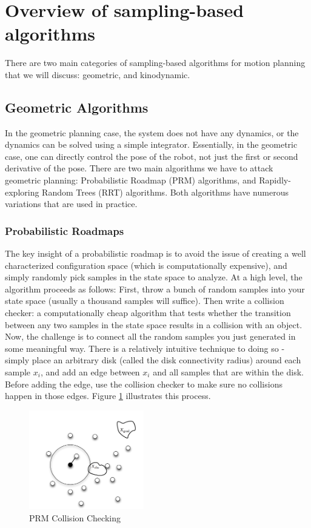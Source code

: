 \documentclass[twoside]{article}
\begin{document}
\section{Overview of sampling-based algorithms} %
There are two main categories of sampling-based algorithms for motion planning that we will discuss: geometric, and kinodynamic.

\subsection{Geometric Algorithms}
In the geometric planning case, the system does not have any dynamics, or the dynamics can be solved using a simple integrator. Essentially, in the geometric case, one can directly control the pose of the robot, not just the first or second derivative of the pose. There are two main algorithms we have to attack geometric planning: Probabilistic Roadmap (PRM) algorithms, and Rapidly-exploring Random Trees (RRT) algorithms. Both algorithms have numerous variations that are used in practice.

\subsubsection{Probabilistic Roadmaps}
The key insight of a probabilistic roadmap is to avoid the issue of creating a well characterized configuration space (which is computationally expensive), and simply randomly pick samples in the state space to analyze. At a high level, the algorithm proceeds as follows: First, throw a bunch of random samples into your state space (usually a thousand samples will suffice). Then write a collision checker: a computationally cheap algorithm that tests whether the transition between any two samples in the state space results in a collision with an object. Now, the challenge is to connect all the random samples you just generated in some meaningful way. There is a relatively intuitive technique to doing so - simply place an arbitrary disk (called the disk connectivity radius) around each sample $x_i$, and add an edge between $x_i$ and all samples that are within the disk. Before adding the edge, use the collision checker to make sure no collisions happen in those edges. Figure \ref{fig:prm_collision} illustrates this process.

\begin{figure}[h!]
  \centering
  \includegraphics[width=50mm]{prm_collision.png}
  \caption{PRM Collision Checking}
  \label{fig:prm_collision}
\end{figure}
\end{document}
